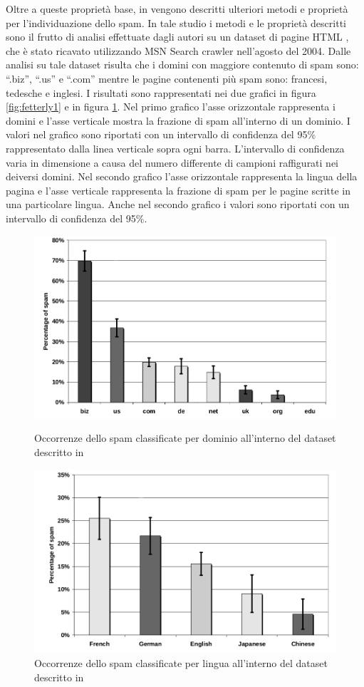 Oltre a queste proprietà base, in \cite{Ntoulas:2006:DSW:1135777.1135794} vengono descritti ulteriori metodi e proprietà per l'individuazione dello spam. In tale studio i metodi e le proprietà descritti  sono il frutto di analisi effettuate dagli autori su un dataset di pagine HTML , che è stato ricavato utilizzando MSN Search crawler nell'agosto del 2004. Dalle analisi su tale dataset risulta che i domini con maggiore contenuto di spam sono: ``.biz'', ``.us'' e ``.com'' mentre le pagine contenenti più spam sono: francesi, tedesche e inglesi. I risultati sono rappresentati nei due grafici in figura \ref{fig:fetterly1} e in figura \ref{fig:fetterly2}. Nel primo grafico l'asse orizzontale rappresenta i domini e l'asse verticale mostra la frazione di spam all'interno di un dominio. I valori nel grafico sono riportati con un intervallo di confidenza del 95\% rappresentato dalla linea verticale sopra ogni barra. L'intervallo di confidenza varia in dimensione a causa del numero differente di campioni raffigurati 
nei deiversi domini. Nel secondo grafico l'asse orizzontale rappresenta la lingua della pagina e l'asse verticale rappresenta la frazione di spam per le pagine scritte in una particolare lingua. Anche nel secondo grafico i valori sono riportati con un intervallo di confidenza del 95\%.
\begin{figure}[htbp]
\centering
\includegraphics[width=12cm]{immagini/fetterly/fetterly1}
\caption{Occorrenze dello spam classificate per dominio all'interno del dataset descritto in \cite{Ntoulas:2006:DSW:1135777.1135794}}
\label{fig:fetterly1}
\includegraphics[width=12cm]{immagini/fetterly/fetterly2}
\caption{Occorrenze dello spam classificate per lingua all'interno del dataset descritto in \cite{Ntoulas:2006:DSW:1135777.1135794}}
\label{fig:fetterly2}
\end{figure}

